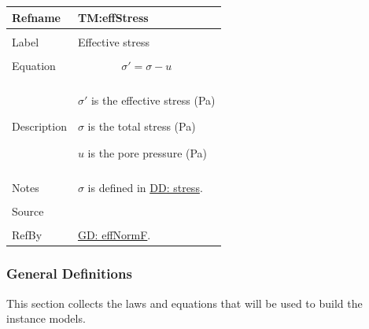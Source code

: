 \documentclass[12pt]{article}
\begin{document}
\noindent \begin{minipage}{\textwidth}
\begin{tabular}{p{} p{}}
\toprule \textbf{Refname} & \textbf{TM:effStress}
\label{TM:effStress}
\\ \midrule \\
Label & Effective stress
\\ \midrule \\
Equation & \begin{displaymath}
           σ'=σ-u
           \end{displaymath}
\\ \midrule \\
Description & \begin{symbDescription}
              \item{$σ'$ is the effective stress (Pa)}
              \item{$σ$ is the total stress (Pa)}
              \item{$u$ is the pore pressure (Pa)}
              \end{symbDescription}
\\ \midrule \\
Notes & $σ$ is defined in \hyperref[DD:stress]{DD: stress}.
\\ \midrule \\
Source & \cite{fredlund1977}
\\ \midrule \\
RefBy & \hyperref[GD:effNormF]{GD: effNormF}.
\\ \bottomrule \end{tabular}
\end{minipage}
\subsubsection{General Definitions}
\label{Sec:GDs}
This section collects the laws and equations that will be used to build the instance models.
\par~
\end{document}
